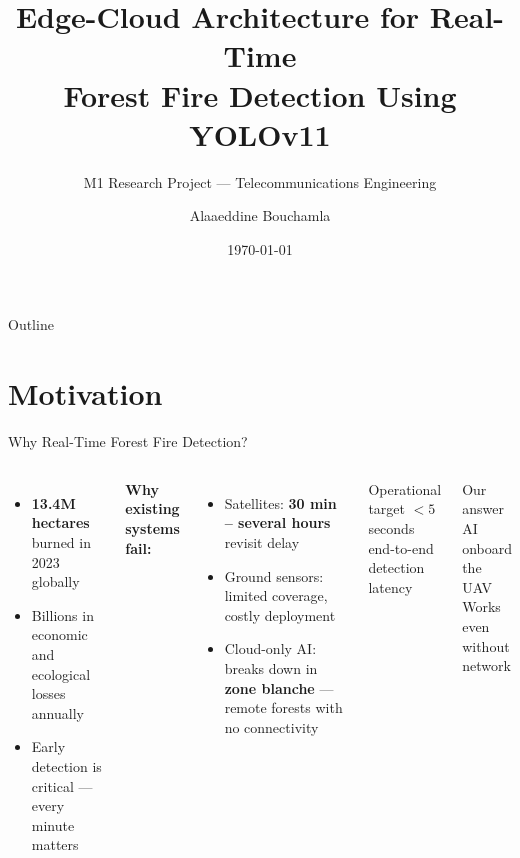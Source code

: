 \documentclass[aspectratio=169,10pt]{beamer}
\title[Fire Detection — Edge-Cloud]{
  Edge-Cloud Architecture for Real-Time\\
  Forest Fire Detection Using YOLOv11
}
\subtitle{M1 Research Project — Telecommunications Engineering}
\author{Alaaeddine Bouchamla}
\institute{École Nationale d'Ingénieurs de Sousse (ENISO)}
\date{\today}
\begin{document}
\begin{frame}
  \titlepage
\end{frame}

\begin{frame}{Outline}
  \tableofcontents
\end{frame}

\section{Motivation}

\begin{frame}{Why Real-Time Forest Fire Detection?}
  \begin{columns}
      \begin{itemize}
        \item \textbf{13.4M hectares} burned in 2023 globally
        \item Billions in economic and ecological losses annually
        \item Early detection is critical — every minute matters
      \end{itemize}
      \vspace{0.6em}
      \textbf{Why existing systems fail:}
      \begin{itemize}
        \item Satellites: \textbf{30 min – several hours} revisit delay
        \item Ground sensors: limited coverage, costly deployment
        \item Cloud-only AI: breaks down in \textbf{zone blanche} — remote
              forests with no connectivity
      \end{itemize}
      \begin{block}{\centering Operational target}
        \centering\Large $< 5$ seconds\\end-to-end detection latency
      \end{block}
      \vspace{0.5em}
      \begin{alertblock}{\centering Our answer}
        \centering AI onboard the UAV\\
        Works even without network
      \end{alertblock}
  \end{columns}
\end{frame}
\end{document}
